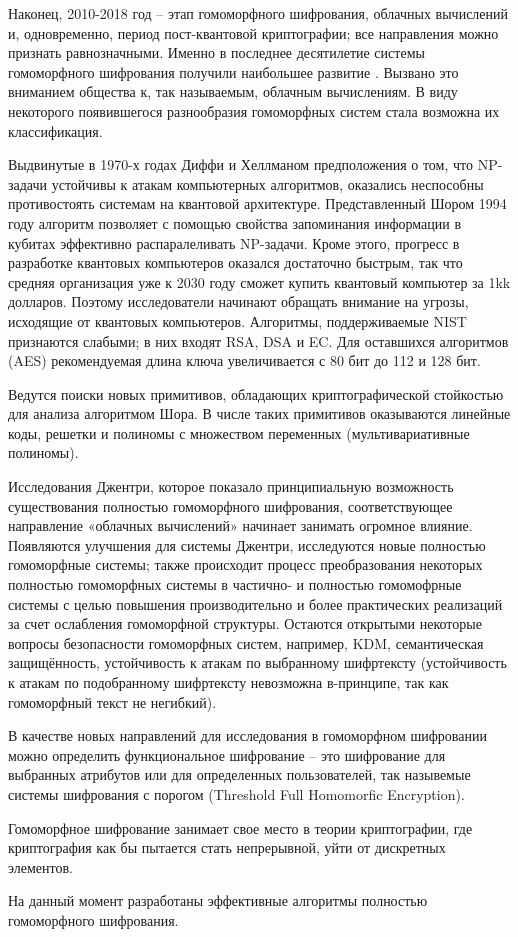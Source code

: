      \color{Red}Наконец, 2010-2018 год – этап гомоморфного шифрования, облачных вычислений и, одновременно, период пост-квантовой криптографии; все направления можно признать равнозначными. \color{Green}Именно в последнее десятилетие системы гомоморфного шифрования получили наибольшее развитие \cite{AsurveyOnHomoEnc-16}. Вызвано это вниманием общества к, так называемым, облачным вычислениям. В виду некоторого появившегося разнообразия гомоморфных систем стала возможна их классификация.\par
     \color{Red}Выдвинутые в 1970-х годах Диффи и Хеллманом предположения о том, что NP-задачи устойчивы к атакам компьютерных алгоритмов, оказались неспособны противостоять системам на квантовой архитектуре. Представленный Шором 1994 году алгоритм позволяет с помощью свойства запоминания информации в кубитах эффективно распаралеливать NP-задачи. Кроме этого, прогресс в разработке квантовых компьютеров оказался достаточно быстрым, так что средняя организация уже к 2030 году сможет купить квантовый компьютер за 1kk долларов. Поэтому исследователи начинают обращать внимание на угрозы, исходящие от квантовых компьютеров. Алгоритмы, поддерживаемые NIST признаются слабыми; в них входят RSA, DSA и EC. Для оставшихся алгоритмов (AES) рекомендуемая длина ключа увеличивается  с 80 бит до 112 и 128 бит. \cite{NIST IR 8105}\par
     \color{PineGreen}Ведутся поиски новых примитивов, обладающих криптографической стойкостью для анализа алгоритмом Шора. В числе таких примитивов оказываются линейные коды, решетки и полиномы с множеством переменных (мультивариативные полиномы).\par
     Исследования Джентри, которое показало принципиальную возможность существования полностью гомоморфного шифрования, соответствующее направление «облачных вычислений» начинает занимать огромное влияние. Появляются улучшения для системы Джентри, исследуются новые полностью гомоморфные системы; также происходит процесс преобразования некоторых полностью гомоморфных системы в частично- и полностью гомомофрные системы с целью повышения производительно и более практических реализаций за счет ослабления гомоморфной структуры. Остаются открытыми некоторые вопросы безопасности гомоморфных систем, например, KDM, семантическая защищённость, устойчивость к атакам по выбранному шифртексту (устойчивость к атакам по подобранному шифртексту невозможна в-принципе, так как гомоморфный текст не негибкий). \cite{ASurveyOnHomoEnc-16}\par
     В качестве новых направлений для исследования в гомоморфном шифровании можно определить функциональное шифрование – это шифрование для выбранных атрибутов или для определенных пользователей, так назывемые системы шифрования с порогом (Threshold Full Homomorfic Encryption).\par
     Гомоморфное шифрование занимает свое место в теории криптографии, где криптография как бы пытается стать непрерывной, уйти от дискретных элементов.\par
     На данный момент разработаны эффективные алгоритмы полностью гомоморфного шифрования.\par

